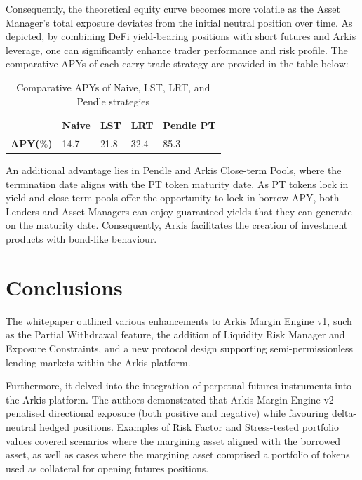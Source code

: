 \documentclass[conference]{IEEEtran}
\begin{document}
Consequently, the theoretical equity curve becomes more volatile as the Asset Manager's total exposure deviates from the initial neutral position over time. As depicted, by combining DeFi yield-bearing positions with short futures and Arkis leverage, one can significantly enhance trader performance and risk profile. The comparative APYs of each carry trade strategy are provided in the table below:

\begin{table}[H] %
    \centering
    \begin{tabular}{|p{1.5cm}|p{1cm}|p{1cm}|p{1cm}|p{2cm}|} %
    \hline
    & \textbf{Naive} & \textbf{LST} & \textbf{LRT} & \textbf{Pendle PT} \\ %
    \hline
    \textbf{APY($\%$)} & 14.7 & 21.8 & 32.4 & 85.3 \\ %
    \hline
    \end{tabular}
    \caption{Comparative APYs of Naive, LST, LRT, and Pendle strategies}
    \label{tab:apy-table}
\end{table}

An additional advantage lies in Pendle and Arkis Close-term Pools, where the termination date aligns with the PT token maturity date. As PT tokens lock in yield and close-term pools offer the opportunity to lock in borrow APY, both Lenders and Asset Managers can enjoy guaranteed yields that they can generate on the maturity date. Consequently, Arkis facilitates the creation of investment products with bond-like behaviour.



\section{Conclusions}
The whitepaper outlined various enhancements to Arkis Margin Engine v1, such as the Partial Withdrawal feature, the addition of Liquidity Risk Manager and Exposure Constraints, and a new protocol design supporting semi-permissionless lending markets within the Arkis platform.

Furthermore, it delved into the integration of perpetual futures instruments into the Arkis platform. The authors demonstrated that Arkis Margin Engine v2 penalised directional exposure (both positive and negative) while favouring delta-neutral hedged positions. Examples of Risk Factor and Stress-tested portfolio values covered scenarios where the margining asset aligned with the borrowed asset, as well as cases where the margining asset comprised a portfolio of tokens used as collateral for opening futures positions.
\end{document}
